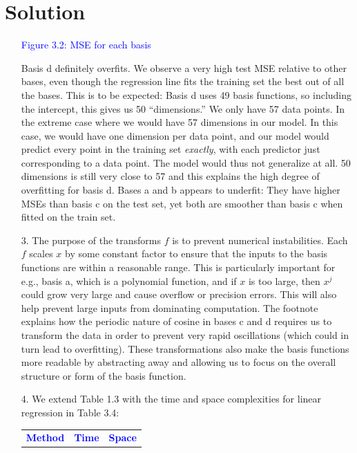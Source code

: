 \documentclass[submit]{../harvardml}
\newenvironment{solution}
  {\color{blue}\section*{Solution}}
{}
\begin{document}
\begin{solution}
\begin{enumerate}
\begin{table}[H]
        \caption*{\textcolor{blue}{Figure 3.2: MSE for each basis}}
        \label{tab:mse_comparison}
    \end{table}
    Basis d definitely overfits. We observe a very high test MSE relative to other bases, even though the regression line fits the training set the best out of all the bases. This is to be expected: Basis d uses 49 basis functions, so including the intercept, this gives us 50 ``dimensions.'' We only have 57 data points. In the extreme case where we would have 57 dimensions in our model. In this case, we would have one dimension per data point, and our model would predict every point in the training set \textit{exactly}, with each predictor just corresponding to a data point. The model would thus not generalize at all. 50 dimensions is still very close to 57 and this explains the high degree of overfitting for basis d.
    \newline \newline
    Bases a and b appears to underfit: They have higher MSEs than basis c on the test set, yet both are smoother than basis c when fitted on the train set.
    \item[3.] The purpose of the transforms $f$ is to prevent numerical instabilities. Each $f$ scales $x$ by some constant factor to ensure that the inputs to the basis functions are within a reasonable range. This is particularly important for e.g., basis a, which is a polynomial function, and if $x$ is too large, then $x^j$ could grow very large and cause overflow or precision errors. This will also help prevent large inputs from dominating computation. The footnote explains how the periodic nature of cosine in bases c and d requires us to transform the data in order to prevent very rapid oscillations (which could in turn lead to overfitting).
    \newline \newline
    These transformations also make the basis functions more readable by abstracting away and allowing us to focus on the overall structure or form of the basis function.
    \item[4.] We extend Table 1.3 with the time and space complexities for linear regression in Table 3.4:
        \begin{table}[H]
            \centering
            \renewcommand{\arraystretch}{1.3} %
            \begin{tabular}{|c|c|c|}
                \hline
                \textbf{\textcolor{blue}{Method}} & \textbf{\textcolor{blue}{Time}} & \textbf{\textcolor{blue}{Space}} \\ 

\end{tabular}
\end{table}
\end{enumerate}
\end{solution}
\end{document}
